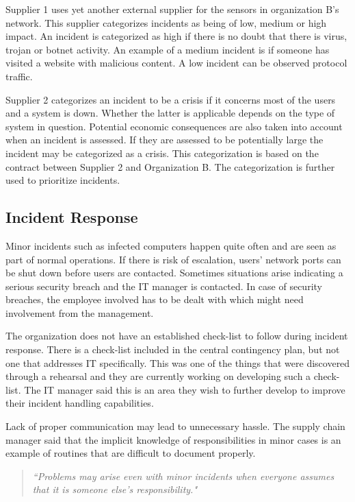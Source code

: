 \documentclass[b5paper, twoside, openright, 11pt]{report}
\begin{document}
Supplier 1 uses yet another external supplier for the sensors in organization B's network. This supplier categorizes incidents as being of low, medium or high impact. An incident is categorized as high if there is no doubt that there is virus, trojan or botnet activity. An example of a medium incident is if someone has visited a website with malicious content. A low incident can be observed protocol traffic.

Supplier 2 categorizes an incident to be a crisis if it concerns most of the users and a system is down. Whether the latter is applicable depends on the type of system in question. Potential economic consequences are also taken into account when an incident is assessed. If they are assessed to be potentially large the incident may be categorized as a crisis. This categorization is based on the contract between Supplier 2 and Organization B. The categorization is further used to prioritize incidents.

\subsection{Incident Response}
Minor incidents such as infected computers happen quite often and are seen as part of normal operations. If there is risk of escalation, users' network ports can be shut down before users are contacted. Sometimes situations arise indicating a serious security breach and the IT manager is contacted. In case of security breaches, the employee involved has to be dealt with which might need involvement from the management.

The organization does not have an established check-list to follow during incident response. There is a check-list included in the central contingency plan, but not one that addresses IT specifically. This was one of the things that were discovered through a rehearsal and they are currently working on developing such a check-list. The IT manager said this is an area they wish to further develop to improve their incident handling capabilities. 

Lack of proper communication may lead to unnecessary hassle. The supply chain manager said that the implicit knowledge of responsibilities in minor cases is an example of routines that are difficult to document properly.

\begin{quote}
\textit{``Problems may arise even with minor incidents when everyone assumes that it is someone else's responsibility."}
\end{quote}
\end{document}
